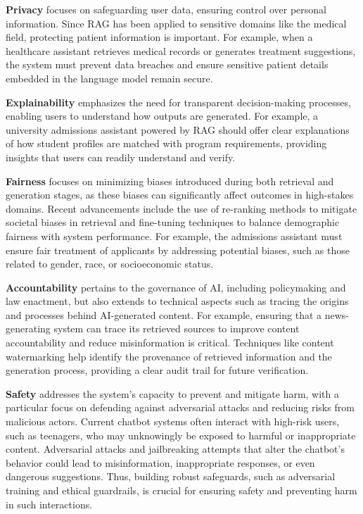 \textbf{Privacy} focuses on safeguarding user data, ensuring control over personal information. Since RAG has been applied to sensitive domains like the medical field, protecting patient information is important. For example, when a healthcare assistant retrieves medical records or generates treatment suggestions, the system must prevent data breaches and ensure sensitive patient details embedded in the language model remain secure. 

\textbf{Explainability} emphasizes the need for transparent decision-making processes, enabling users to understand how outputs are generated. For example, a university admissions assistant powered by RAG should offer clear explanations of how student profiles are matched with program requirements, providing insights that users can readily understand and verify.

\textbf{Fairness} focuses on minimizing biases introduced during both retrieval and generation stages, as these biases can significantly affect outcomes in high-stakes domains. Recent advancements include the use of re-ranking methods to mitigate societal biases in retrieval and fine-tuning techniques to balance demographic fairness with system performance. %
For example, the admissions assistant must ensure fair treatment of applicants by addressing potential biases, such as those related to gender, race, or socioeconomic status.

\textbf{Accountability} pertains to the governance of AI, including policymaking and law enactment, but also extends to technical aspects such as tracing the origins and processes behind AI-generated content. For example, ensuring that a news-generating system can trace its retrieved sources to improve content accountability and reduce misinformation is critical. Techniques like content watermarking help identify the provenance of retrieved information and the generation process, providing a clear audit trail for future verification.

\textbf{Safety} addresses the system's capacity to prevent and mitigate harm, with a particular focus on defending against adversarial attacks and reducing risks from malicious actors. Current chatbot systems often interact with high-risk users, such as teenagers, who may unknowingly be exposed to harmful or inappropriate content. Adversarial attacks and jailbreaking attempts that alter the chatbot's behavior could lead to misinformation, inappropriate responses, or even dangerous suggestions. Thus, building robust safeguards, such as adversarial training and ethical guardrails, is crucial for ensuring safety and preventing harm in such interactions.

